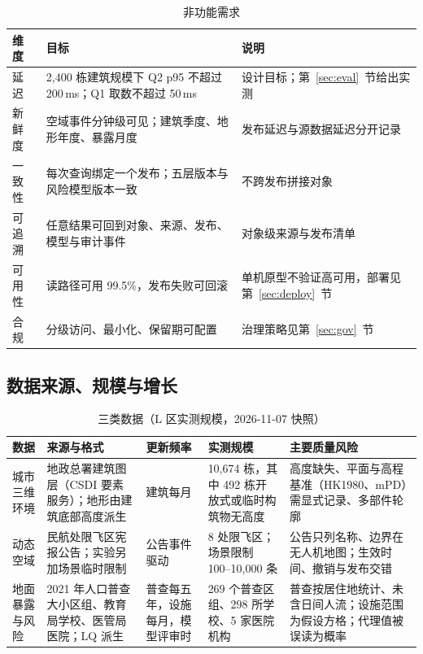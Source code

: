 \documentclass[a4paper,11pt,UTF8]{ctexart}
\begin{document}
\begin{table}[!htbp]\centering\small
\caption{非功能需求}
\begin{tabularx}{\textwidth}{L{1.6cm}L{5.6cm}Y}
\toprule
维度 & 目标 & 说明 \\
\midrule
延迟 & 2,400 栋建筑规模下 Q2 p95 不超过 200\,ms；Q1 取数不超过 50\,ms & 设计目标；第~\ref{sec:eval}~节给出实测 \\
新鲜度 & 空域事件分钟级可见；建筑季度、地形年度、暴露月度 & 发布延迟与源数据延迟分开记录 \\
一致性 & 每次查询绑定一个发布；五层版本与风险模型版本一致 & 不跨发布拼接对象 \\
可追溯 & 任意结果可回到对象、来源、发布、模型与审计事件 & 对象级来源与发布清单 \\
可用性 & 读路径可用 99.5\%，发布失败可回滚 & 单机原型不验证高可用，部署见第~\ref{sec:deploy}~节 \\
合规 & 分级访问、最小化、保留期可配置 & 治理策略见第~\ref{sec:gov}~节 \\
\bottomrule
\end{tabularx}
\end{table}

\subsection{数据来源、规模与增长}

\begin{table}[!htbp]\centering\small
\caption{三类数据（L 区实测规模，2026-11-07 快照）}
\begin{tabularx}{\textwidth}{L{1.7cm}L{2.9cm}L{1.9cm}L{2.3cm}Y}
\toprule
数据 & 来源与格式 & 更新频率 & 实测规模 & 主要质量风险 \\
\midrule
城市三维环境 & 地政总署建筑图层（CSDI 要素服务）；地形由建筑底部高度派生 & 建筑每月 & 10,674 栋，其中 492 栋开放式或临时构筑物无高度 & 高度缺失、平面与高程基准（HK1980、mPD）需显式记录、多部件轮廓 \\
动态空域 & 民航处限飞区宪报公告；实验另加场景临时限制 & 公告事件驱动 & 8 处限飞区；场景限制 100–10,000 条 & 公告只列名称、边界在无人机地图；生效时间、撤销与发布交错 \\
地面暴露与风险 & 2021 年人口普查大小区组、教育局学校、医管局医院；LQ 派生 & 普查每五年，设施每月，模型评审时 & 269 个普查区组、298 所学校、5 家医院机构 & 普查按居住地统计、未含日间人流；设施范围为假设方格；代理值被误读为概率 \\
\bottomrule
\end{tabularx}
\end{table}
\end{document}
